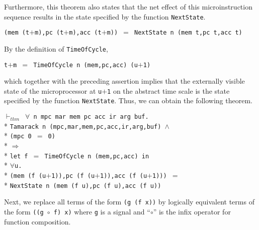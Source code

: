 \begin{normalsize}
Furthermore, this theorem also states that the net effect of this
microinstruction sequence results in the state specified by
the function \verb"NextState".

\hspace*{\fill}
\verb"(mem (t"$+$\verb"m),pc (t"$+$\verb"m),acc (t"$+$\verb"m)) "$=$\verb" NextState n (mem t,pc t,acc t)"
\hspace*{\fill}

By the definition of \verb"TimeOfCycle",

\hspace*{\fill}
\verb"t"$+$\verb"m "$=$\verb" TimeOfCycle n (mem,pc,acc) (u"$+$\verb"1)"
\hspace*{\fill}

which together with the preceding assertion implies that the
externally visible
state of the microprocessor at \verb"u"$+$\verb"1" on the abstract
time scale is the state specified by the function \verb"NextState".
Thus, we can obtain the following theorem.

\hspace*{\fill}
\begin{minipage}{17cm}
$\vdash_{thm}$\verb" "$\forall$\verb" n mpc mar mem pc acc ir arg buf."\\*
\verb"Tamarack n (mpc,mar,mem,pc,acc,ir,arg,buf) "$\wedge$\\*
\verb"(mpc 0 "$=$\verb" 0)"\\*
$\Longrightarrow$\\*
\verb"let f "$=$\verb" TimeOfCycle n (mem,pc,acc) in"\\*
$\forall$\verb"u."\\*
\verb"(mem (f (u"$+$\verb"1)),pc (f (u"$+$\verb"1)),acc (f (u"$+$\verb"1))) "$=$\\*
\verb"NextState n (mem (f u),pc (f u),acc (f u))"
\end{minipage}
\hspace*{\fill}

Next, we replace all terms of the form
\mbox{\verb"(g (f x))"} by logically equivalent terms of the form
\mbox{\verb"((g "$\circ$\verb" f) x)"}
where \verb"g" is a signal and ``$\circ$'' is the infix
operator for function composition.


\end{normalsize}
